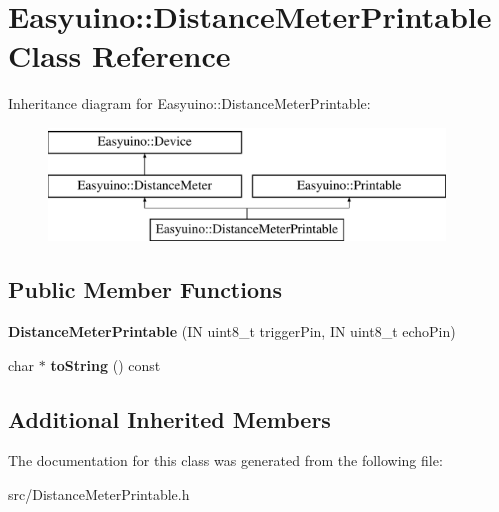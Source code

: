 \hypertarget{class_easyuino_1_1_distance_meter_printable}{}\section{Easyuino\+:\+:Distance\+Meter\+Printable Class Reference}
\label{class_easyuino_1_1_distance_meter_printable}
Inheritance diagram for Easyuino\+:\+:Distance\+Meter\+Printable\+:\begin{figure}[H]
\begin{center}
\leavevmode
\includegraphics[height=3.000000cm]{class_easyuino_1_1_distance_meter_printable}
\end{center}
\end{figure}
\subsection*{Public Member Functions}
\begin{DoxyCompactItemize}
\item 
\mbox{\label{class_easyuino_1_1_distance_meter_printable_a367fe13996801c142f687234390bfc8c}} 
{\bfseries Distance\+Meter\+Printable} (IN uint8\+\_\+t trigger\+Pin, IN uint8\+\_\+t echo\+Pin)
\item 
\mbox{\label{class_easyuino_1_1_distance_meter_printable_a42bb42319353c84294975ed5edc3a84c}} 
char $\ast$ {\bfseries to\+String} () const
\end{DoxyCompactItemize}
\subsection*{Additional Inherited Members}


The documentation for this class was generated from the following file\+:\begin{DoxyCompactItemize}
\item 
src/Distance\+Meter\+Printable.\+h\end{DoxyCompactItemize}
